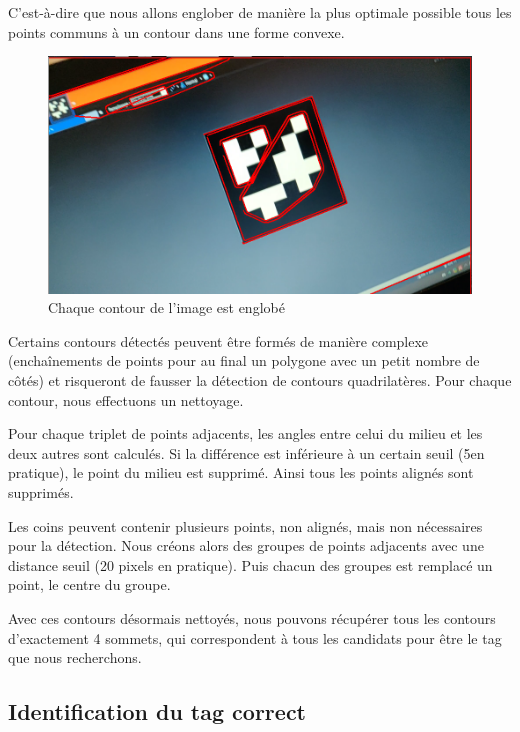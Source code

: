         C'est-à-dire que nous allons englober de manière la plus optimale possible tous les points communs à un contour dans une forme convexe.

        \begin{figure}[!h]
            \centering
            \includegraphics[scale=0.25]{img/convex_hull.png}
            \caption{Chaque contour de l'image est englobé}
        \end{figure}

        Certains contours détectés peuvent être formés de manière complexe (enchaînements de points pour au final un polygone avec un petit nombre de côtés) et risqueront de fausser la détection de contours quadrilatères. Pour chaque contour, nous effectuons un nettoyage. 

        Pour chaque triplet de points adjacents, les angles entre celui du milieu et les deux autres sont calculés. Si la différence est inférieure à un certain seuil (5\degree en pratique), le point du milieu est supprimé. Ainsi tous les points alignés sont supprimés. 

        Les coins peuvent contenir plusieurs points, non alignés, mais non nécessaires pour la détection. Nous créons alors des groupes de points adjacents avec une distance seuil (20 pixels en pratique). Puis chacun des groupes est remplacé un point, le centre du groupe.

        Avec ces contours désormais nettoyés, nous pouvons récupérer tous les contours d'exactement 4 sommets, qui correspondent à tous les candidats pour être le tag que nous recherchons.

        \subsection{Identification du tag correct}

